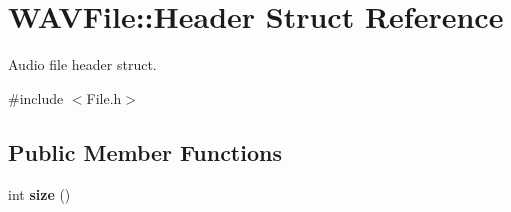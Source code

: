 \hypertarget{struct_w_a_v_file_1_1_header}{}\section{W\+A\+V\+File\+:\+:Header Struct Reference}
\label{struct_w_a_v_file_1_1_header}


Audio file header struct.  




{\ttfamily \#include $<$File.\+h$>$}

\subsection*{Public Member Functions}
\begin{DoxyCompactItemize}
\item 
\mbox{\label{struct_w_a_v_file_1_1_header_aa725ada977810d575cad1a55b0030514}} 
int {\bfseries size} ()
\end{DoxyCompactItemize}
